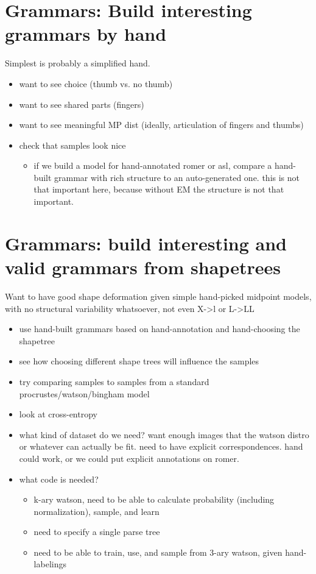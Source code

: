 \documentclass{book}
\begin{document}
\section{Grammars: Build interesting grammars by hand}
\label{sec-7_11}

Simplest is probably a simplified hand.
\begin{itemize}
\item want to see choice (thumb vs. no thumb)
\item want to see shared parts (fingers)
\item want to see meaningful MP dist (ideally, articulation of
   fingers and thumbs)
\item check that samples look nice

\begin{itemize}
\item if we build a model for hand-annotated romer or asl, compare a
    hand-built grammar with rich structure to an auto-generated
    one. this is not that important here, because without EM the
    structure is not that important.
\end{itemize}

\end{itemize}
\section{Grammars: build interesting and valid grammars from shapetrees}
\label{sec-7_12}

Want to have good shape deformation given simple hand-picked midpoint
models, with no structural variability whatsoever, not even X->l or
L->LL
\begin{itemize}
\item use hand-built grammars based on hand-annotation and
    hand-choosing the shapetree
\item see how choosing different shape trees will influence the
    samples
\item try comparing samples to samples from a standard
    procrustes/watson/bingham model
\item look at cross-entropy
\item what kind of dataset do we need? want enough images that the
    watson distro or whatever can actually be fit. need to have
    explicit correspondences. hand could work, or we could put
    explicit annotations on romer.
\item what code is needed?

\begin{itemize}
\item k-ary watson, need to be able to calculate probability
      (including normalization), sample, and learn
\item need to specify a single parse tree
\item need to be able to train, use, and sample from 3-ary watson,
      given hand-labelings
\end{itemize}

\end{itemize}
\end{document}
